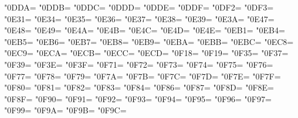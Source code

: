 \XeTeXcharclass"0DDA=\KclassCM
\XeTeXcharclass"0DDB=\KclassCM
\XeTeXcharclass"0DDC=\KclassCM
\XeTeXcharclass"0DDD=\KclassCM
\XeTeXcharclass"0DDE=\KclassCM
\XeTeXcharclass"0DDF=\KclassCM
\XeTeXcharclass"0DF2=\KclassCM
\XeTeXcharclass"0DF3=\KclassCM
\XeTeXcharclass"0E31=\KclassCM
\XeTeXcharclass"0E34=\KclassCM
\XeTeXcharclass"0E35=\KclassCM
\XeTeXcharclass"0E36=\KclassCM
\XeTeXcharclass"0E37=\KclassCM
\XeTeXcharclass"0E38=\KclassCM
\XeTeXcharclass"0E39=\KclassCM
\XeTeXcharclass"0E3A=\KclassCM
\XeTeXcharclass"0E47=\KclassCM
\XeTeXcharclass"0E48=\KclassCM
\XeTeXcharclass"0E49=\KclassCM
\XeTeXcharclass"0E4A=\KclassCM
\XeTeXcharclass"0E4B=\KclassCM
\XeTeXcharclass"0E4C=\KclassCM
\XeTeXcharclass"0E4D=\KclassCM
\XeTeXcharclass"0E4E=\KclassCM
\XeTeXcharclass"0EB1=\KclassCM
\XeTeXcharclass"0EB4=\KclassCM
\XeTeXcharclass"0EB5=\KclassCM
\XeTeXcharclass"0EB6=\KclassCM
\XeTeXcharclass"0EB7=\KclassCM
\XeTeXcharclass"0EB8=\KclassCM
\XeTeXcharclass"0EB9=\KclassCM
\XeTeXcharclass"0EBA=\KclassCM
\XeTeXcharclass"0EBB=\KclassCM
\XeTeXcharclass"0EBC=\KclassCM
\XeTeXcharclass"0EC8=\KclassCM
\XeTeXcharclass"0EC9=\KclassCM
\XeTeXcharclass"0ECA=\KclassCM
\XeTeXcharclass"0ECB=\KclassCM
\XeTeXcharclass"0ECC=\KclassCM
\XeTeXcharclass"0ECD=\KclassCM
\XeTeXcharclass"0F18=\KclassCM
\XeTeXcharclass"0F19=\KclassCM
\XeTeXcharclass"0F35=\KclassCM
\XeTeXcharclass"0F37=\KclassCM
\XeTeXcharclass"0F39=\KclassCM
\XeTeXcharclass"0F3E=\KclassCM
\XeTeXcharclass"0F3F=\KclassCM
\XeTeXcharclass"0F71=\KclassCM
\XeTeXcharclass"0F72=\KclassCM
\XeTeXcharclass"0F73=\KclassCM
\XeTeXcharclass"0F74=\KclassCM
\XeTeXcharclass"0F75=\KclassCM
\XeTeXcharclass"0F76=\KclassCM
\XeTeXcharclass"0F77=\KclassCM
\XeTeXcharclass"0F78=\KclassCM
\XeTeXcharclass"0F79=\KclassCM
\XeTeXcharclass"0F7A=\KclassCM
\XeTeXcharclass"0F7B=\KclassCM
\XeTeXcharclass"0F7C=\KclassCM
\XeTeXcharclass"0F7D=\KclassCM
\XeTeXcharclass"0F7E=\KclassCM
\XeTeXcharclass"0F7F=\KclassCM
\XeTeXcharclass"0F80=\KclassCM
\XeTeXcharclass"0F81=\KclassCM
\XeTeXcharclass"0F82=\KclassCM
\XeTeXcharclass"0F83=\KclassCM
\XeTeXcharclass"0F84=\KclassCM
\XeTeXcharclass"0F86=\KclassCM
\XeTeXcharclass"0F87=\KclassCM
\XeTeXcharclass"0F8D=\KclassCM
\XeTeXcharclass"0F8E=\KclassCM
\XeTeXcharclass"0F8F=\KclassCM
\XeTeXcharclass"0F90=\KclassCM
\XeTeXcharclass"0F91=\KclassCM
\XeTeXcharclass"0F92=\KclassCM
\XeTeXcharclass"0F93=\KclassCM
\XeTeXcharclass"0F94=\KclassCM
\XeTeXcharclass"0F95=\KclassCM
\XeTeXcharclass"0F96=\KclassCM
\XeTeXcharclass"0F97=\KclassCM
\XeTeXcharclass"0F99=\KclassCM
\XeTeXcharclass"0F9A=\KclassCM
\XeTeXcharclass"0F9B=\KclassCM
\XeTeXcharclass"0F9C=\KclassCM
